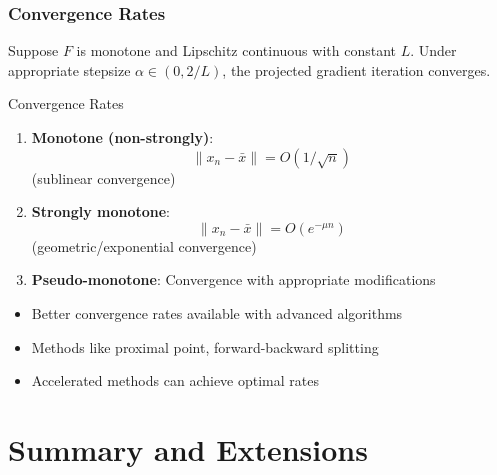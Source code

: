 \documentclass[aspectratio=169,10pt]{beamer}
\begin{document}
\begin{frame}
\frametitle{Convergence Rates}

\vspace{0.2cm}

\begin{theorem}
Suppose $F$ is monotone and Lipschitz continuous with constant $L$.
Under appropriate stepsize $\alpha \in (0, 2/L)$, the projected gradient iteration converges.
\end{theorem}

\vspace{0.3cm}

\begin{block}{Convergence Rates}

\begin{enumerate}
    \item \textbf{Monotone (non-strongly)}:
    \[\|x_n - \bar{x}\| = O(1/\sqrt{n})\]
    (sublinear convergence)

    \item \textbf{Strongly monotone}:
    \[\|x_n - \bar{x}\| = O(e^{-\mu n})\]
    (geometric/exponential convergence)

    \item \textbf{Pseudo-monotone}: Convergence with appropriate modifications
\end{enumerate}

\end{block}

\vspace{0.3cm}

\begin{itemize}
    \item Better convergence rates available with advanced algorithms
    \item Methods like proximal point, forward-backward splitting
    \item Accelerated methods can achieve optimal rates
\end{itemize}

\end{frame}


\section{Summary and Extensions}
\end{document}
